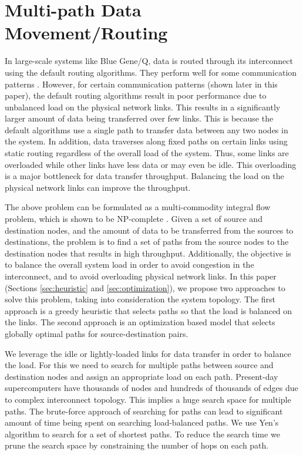 \section{Multi-path Data Movement/Routing}
\label{sec:approach}

In large-scale systems like Blue Gene/Q, data is routed through its interconnect using the default routing algorithms. They perform well for some communication patterns \cite{Chen:BGQ}. However, for certain communication patterns (shown later in this paper), the default routing algorithms result in poor performance due to unbalanced load on the physical network links. This results in a significantly larger amount of data being transferred over few links. This is because the default algorithms use a single path to transfer data between any two nodes in the system. In addition, data traverses along fixed paths on certain links using static routing regardless of the overall load of the system. Thus, some links are overloaded while other links have less data or may even be idle. This overloading is a major bottleneck for data transfer throughput. Balancing the load on the physical network links can improve the throughput. 

The above problem can be formulated as a multi-commodity integral flow problem, which is shown to be NP-complete \cite{even1975}. Given a set of source and destination nodes, and the amount of data to be transferred from the sources to destinations, the problem is to find a set of paths from the source nodes to the destination nodes that results in high throughput. Additionally, the objective is to balance the overall system load in order to avoid congestion in the interconnect, and to avoid overloading physical network links. In this paper (Sections \ref{sec:heuristic} and \ref{sec:optimization}), we propose two approaches to solve this problem, taking into consideration the system topology. The first approach is a greedy heuristic that selects paths so that the load is balanced on the links. The second approach is an optimization based model that selects globally optimal paths for source-destination pairs. 

We leverage the idle or lightly-loaded links for data transfer in order to balance the load. For this we need to search for multiple paths between source and destination nodes and assign an appropriate load on each path. Present-day supercomputers have thousands of nodes and hundreds of thousands of edges due to complex interconnect topology. This implies a huge search space for multiple paths. The brute-force approach of searching for paths can lead to significant amount of time being spent on searching load-balanced paths. We use Yen's algorithm \cite{Yen:Kpath} to search for a set of shortest paths. To reduce the search time we prune the search space by constraining the number of hops on each path. 

